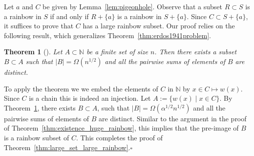 \documentclass{article}
\newtheorem{thm}{Theorem}%
\theoremstyle{definition}
\begin{document}
Let $a$ and $C$ be given by Lemma~\ref{lem:pigeonhole}.
Observe that a subset $R\subset S$ is a rainbow in $S$ if and only if $R+\{a\}$ is a rainbow in $S+\{a\}$.
Since $C\subset S+\{a\}$, it suffices to prove that $C$ has a large rainbow subset. 
Our proof relies on the following result, which generalizes Theorem~\ref{thm:erdos1941problem}.
\begin{thm}[\cite{komlos1975linear}]\label{thm:komlos1975linear}
Let $A\subset \mathbb{N}$ be a finite set of size $n$. Then there exists a subset $B\subset A$ such that $|B|=\Omega(n^{1/2})$ and all the pairwise sums of elements of $B$ are distinct. 
\end{thm}

To apply the theorem we we embed the elements of $C$ in $\mathbb{N}$ by $x\in C\mapsto w(x)$. Since $C$ is a chain this is indeed an injection. Let $A:=\{w(x)\mid x\in C\}$.
By Theorem~\ref{thm:komlos1975linear}, there exists $B\subset A$, such that $|B|=\Omega(\alpha^{1/2}n^{1/2})$ and all the pairwise sums of elements of $B$ are distinct. 
Similar to the argument in the proof of Theorem~\ref{thm:existence_huge_rainbow}, this implies that the pre-image of $B$ is a rainbow subset of $C$. This completes the proof of Theorem~\ref{thm:large_set_large_rainbow}.\hfill$\square$






 


\end{document}
